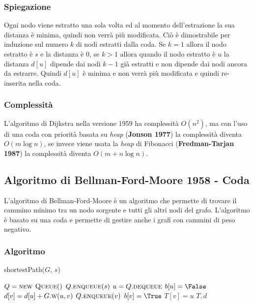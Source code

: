     \subsubsection{Spiegazione}
        Ogni nodo viene estratto una sola volta ed al momento dell'estrazione la sua distanza è minima, quindi non verrà più modificata. Ciò è dimostrabile per induzione sul numero $k$ di nodi estratti dalla coda. Se $k=1$ allora il nodo estratto è $s$ e la distanza è $0$, se $k>1$ allora quando il nodo estratto è $u$ la distanza $d[u]$ dipende dai nodi $k-1$ già estratti e non dipende dai nodi ancora da estrarre. Quindi $d[u]$ è minima e non verrà più modificata e quindi re-inserita nella coda.
    \subsubsection{Complessità}
        L'algoritmo di Dijkstra nella versione 1959 ha complessità $O(n^2)$, ma con l'uso di una coda con priorità basata su \textit{heap} (\textbf{Jonson 1977}) la complessità diventa $O(m\log n)$, se invece viene usata la \textit{heap} di Fibonacci (\textbf{Fredman-Tarjan 1987}) la complessità diventa $O(m+n\log n)$.
    \subsection{Algoritmo di Bellman-Ford-Moore 1958 - Coda}
        L'algoritmo di Bellman-Ford-Moore è un algoritmo che permette di trovare il cammino minimo tra un nodo sorgente e tutti gli altri nodi del grafo. L'algoritmo è basato su una coda e permette di gestire anche i grafi con cammini di peso negativo.
        \subsubsection{Algoritmo}
            \begin{algorithm}[H]
                \caption{shortestPath(\Graph $G$, \Node $s$)}
                \begin{algorithmic}
                    \State \Queue $Q = \textsc{new Queue}()$
                    \State $Q.\Call{enqueue}{s}$
                        \State \Node $u = Q.\Call{dequeue}{}$
                        \State $b[u]=\False$
                                \State $d[v]=d[u]+G.\Call{w}{u,v}$
                                    \State $Q.\Call{enqueue}{v}$
                                    \State $b[v]=\True$
                                \EndIf
                                \State $T[v]=u$
                            \EndIf
                        \EndFor
                    \EndWhile
                    \State \Return $T,d$
                \end{algorithmic}
            \end{algorithm}

